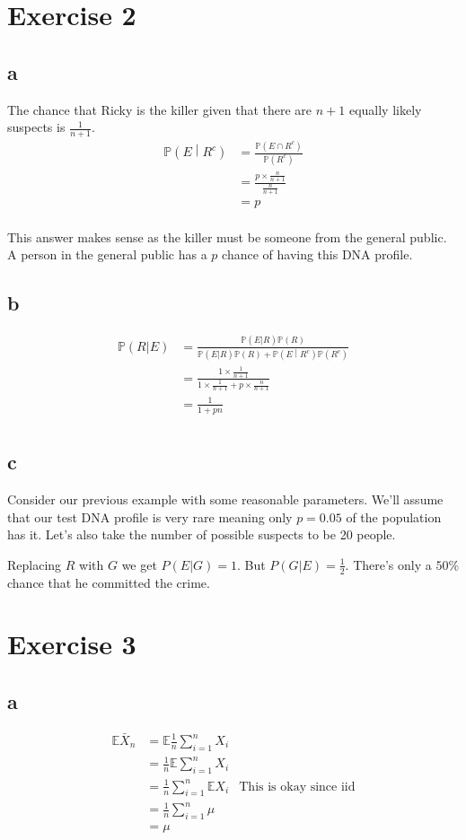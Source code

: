 \documentclass{article}
\newcommand{\prob}{\mathbb{P}}
\newcommand{\expect}{\mathbb{E}}
\begin{document}
\section{Exercise 2}
\subsection{a}
The chance that Ricky is the killer given that there are $n+1$ equally likely
suspects is $\frac{1}{n+1}$.
\begin{align*}
    \prob \left(E \middle| R^c\right)
    &= \frac{\prob \left(E \cap R^c\right)}{\prob \left(R^c\right)} \\
    &= \frac{p \times \frac{n}{n+1}}{\frac{n}{n+1}} \\
    &= p \\
\end{align*}

This answer makes sense as the killer must be someone from the general public.
A person in the general public has a $p$ chance of having this DNA profile.

\subsection{b}
\begin{align*}
    \prob(R|E)
    &= \frac{\prob(E|R) \prob(R)}{\prob(E|R)\prob(R)
        + \prob\left(E\middle|R^c\right)\prob\left(R^c\right)} \\
    &= \frac{1 \times \frac{1}{n+1}}{1 \times \frac{1}{n+1} + p \times \frac{n}{n+1}} \\
    &= \frac{1}{1 + pn} \\
\end{align*}

\subsection{c}
Consider our previous example with some reasonable parameters. We'll assume
that our test DNA profile is very rare meaning only $p=0.05$ of the population
has it. Let's also take the number of possible suspects to be 20 people.

Replacing $R$ with $G$ we get $P(E|G) = 1$. But $P(G|E) = \frac{1}{2}$.
There's only a $50\%$ chance that he committed the crime.

\section{Exercise 3}
\subsection{a}
\begin{align*}
    \expect \bar{X}_n
    &= \expect \frac{1}{n} \sum_{i=1}^n X_i \\
    &= \frac{1}{n} \expect \sum_{i=1}^n X_i \\
    &= \frac{1}{n} \sum_{i=1}^n \expect X_i & \text{This is okay since iid} \\
    &= \frac{1}{n} \sum_{i=1}^n \mu \\
    &= \mu \\
\end{align*}
\end{document}
